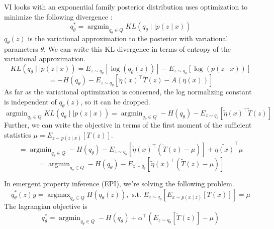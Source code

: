 \documentclass[11pt]{article}
\DeclareMathOperator*{\argmin}{argmin}
\DeclareMathOperator*{\argmax}{argmax}
\begin{document}
VI looks with an exponential family posterior distribution uses optimization to minimize the following divergence \cite{blei2017variational}:
\begin{equation}
q_\theta^* = \argmin_{q_\theta \in Q} KL(q_\theta \mid \mid p(z \mid x))
\end{equation}
$q_\theta(z)$ is the variational approximation to the posterior with variational parameters $\theta$.  We can write this KL divergence in terms of entropy of the variational approximation.
\begin{equation}
KL(q_\theta \mid \mid p(z \mid x)) = E_{z \sim q_\theta} \left[ \log (q_\theta(z)) \right] - E_{z \sim q_\theta} \left[ \log (p(z \mid x)) \right]
\end{equation}
\begin{equation}
 = -H(q_\theta) - E_{z \sim q_\theta} \left[ \tilde{\eta}(x)^\top  \tilde{T}(z) - A(\eta(x)) \right]
\end{equation}
As far as the variational optimization is concerned, the log normalizing constant is independent of $q_\theta(z)$, so it can be dropped. 
\begin{equation}
 \argmin_{q_\theta \in Q} KL(q_\theta \mid \mid p(z \mid x)) =  \argmin_{q_\theta \in Q} -H(q_\theta) - E_{z \sim q_\theta} \left[ \tilde{\eta}(x)^\top  \tilde{T}(z) \right]
 \end{equation}
 Further, we can write the objective in terms of the first moment of the sufficient statistics $\mu = E_{z \sim p(z \mid x)}\left[T(z) \right]$.
 \begin{equation}
=  \argmin_{q_\theta \in Q} -H(q_\theta) - E_{z \sim q_\theta} \left[ \tilde{\eta}(x)^\top \left(  \tilde{T}(z) -\mu \right) \right] + \tilde{\eta(x)}^\top \mu
 \end{equation}
  \begin{equation}
=  \argmin_{q_\theta \in Q} -H(q_\theta) - E_{z \sim q_\theta} \left[ \tilde{\eta}(x)^\top \left(  \tilde{T}(z) -\mu \right) \right]
 \end{equation}

In emergent property inference (EPI), we're solving the following problem.
\begin{equation}
q_\theta^*(z) y= \argmax_{q_\theta \in Q} H(q_\theta(z)),   \text{  s.t.  } E_{z \sim q_\theta}\left[ E_{x\sim p(x \mid z)}\left[T(x)\right] \right] = \mu
\end{equation}
The lagrangian objective is
\begin{equation}
q_\theta^* = \argmin_{q_\theta \in Q} - H(q_\theta) + \alpha^\top \left(E_{z \sim q_\theta} \left[\tilde{T}(z) \right] - \mu \right)
\end{equation}
\end{document}
